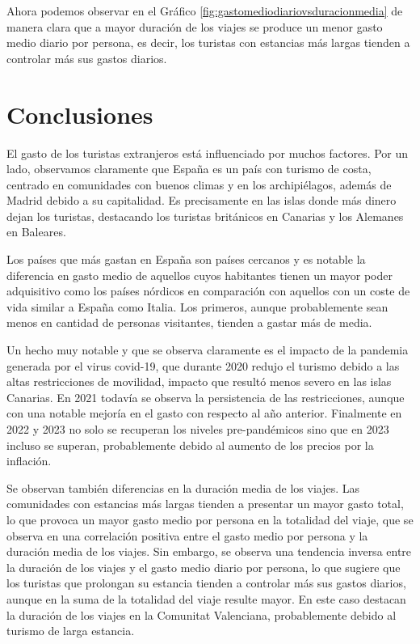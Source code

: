 \documentclass[data,article,submit,moreauthors,pdftex]{Definitions/mdpi}
\begin{document}
Ahora podemos observar en el Gráfico
\ref{fig:gastomediodiariovsduracionmedia} de manera clara que a mayor
duración de los viajes se produce un menor gasto medio diario por
persona, es decir, los turistas con estancias más largas tienden a
controlar más sus gastos diarios.

\hypertarget{conclusiones}{%
\section{Conclusiones}\label{conclusiones}}

El gasto de los turistas extranjeros está influenciado por muchos
factores. Por un lado, observamos claramente que España es un país con
turismo de costa, centrado en comunidades con buenos climas y en los
archipiélagos, además de Madrid debido a su capitalidad. Es precisamente
en las islas donde más dinero dejan los turistas, destacando los
turistas británicos en Canarias y los Alemanes en Baleares.

Los países que más gastan en España son países cercanos y es notable la
diferencia en gasto medio de aquellos cuyos habitantes tienen un mayor
poder adquisitivo como los países nórdicos en comparación con aquellos
con un coste de vida similar a España como Italia. Los primeros, aunque
probablemente sean menos en cantidad de personas visitantes, tienden a
gastar más de media.

Un hecho muy notable y que se observa claramente es el impacto de la
pandemia generada por el virus covid-19, que durante 2020 redujo el
turismo debido a las altas restricciones de movilidad, impacto que
resultó menos severo en las islas Canarias. En 2021 todavía se observa
la persistencia de las restricciones, aunque con una notable mejoría en
el gasto con respecto al año anterior. Finalmente en 2022 y 2023 no solo
se recuperan los niveles pre-pandémicos sino que en 2023 incluso se
superan, probablemente debido al aumento de los precios por la
inflación.

Se observan también diferencias en la duración media de los viajes. Las
comunidades con estancias más largas tienden a presentar un mayor gasto
total, lo que provoca un mayor gasto medio por persona en la totalidad
del viaje, que se observa en una correlación positiva entre el gasto
medio por persona y la duración media de los viajes. Sin embargo, se
observa una tendencia inversa entre la duración de los viajes y el gasto
medio diario por persona, lo que sugiere que los turistas que prolongan
su estancia tienden a controlar más sus gastos diarios, aunque en la
suma de la totalidad del viaje resulte mayor. En este caso destacan la
duración de los viajes en la Comunitat Valenciana, probablemente debido
al turismo de larga estancia.
\end{document}
